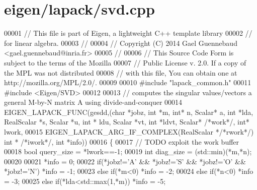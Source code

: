 \hypertarget{eigen_2lapack_2svd_8cpp_source}{}\section{eigen/lapack/svd.cpp}
\label{eigen_2lapack_2svd_8cpp_source}

\begin{DoxyCode}
00001 \textcolor{comment}{// This file is part of Eigen, a lightweight C++ template library}
00002 \textcolor{comment}{// for linear algebra.}
00003 \textcolor{comment}{//}
00004 \textcolor{comment}{// Copyright (C) 2014 Gael Guennebaud <gael.guennebaud@inria.fr>}
00005 \textcolor{comment}{//}
00006 \textcolor{comment}{// This Source Code Form is subject to the terms of the Mozilla}
00007 \textcolor{comment}{// Public License v. 2.0. If a copy of the MPL was not distributed}
00008 \textcolor{comment}{// with this file, You can obtain one at http://mozilla.org/MPL/2.0/.}
00009 
00010 \textcolor{preprocessor}{#include "lapack\_common.h"}
00011 \textcolor{preprocessor}{#include <Eigen/SVD>}
00012 
00013 \textcolor{comment}{// computes the singular values/vectors a general M-by-N matrix A using divide-and-conquer}
00014 EIGEN\_LAPACK\_FUNC(gesdd,(\textcolor{keywordtype}{char} *jobz, \textcolor{keywordtype}{int} *m, \textcolor{keywordtype}{int}* n, Scalar* a, \textcolor{keywordtype}{int} *lda, RealScalar *s, Scalar *u, \textcolor{keywordtype}{int} *
      ldu, Scalar *vt, \textcolor{keywordtype}{int} *ldvt, Scalar* \textcolor{comment}{/*work*/}, \textcolor{keywordtype}{int}* lwork,
00015                          EIGEN\_LAPACK\_ARG\_IF\_COMPLEX(RealScalar *\textcolor{comment}{/*rwork*/}) \textcolor{keywordtype}{int} * \textcolor{comment}{/*iwork*/}, \textcolor{keywordtype}{int} *info))
00016 \{
00017   \textcolor{comment}{// TODO exploit the work buffer}
00018   \textcolor{keywordtype}{bool} query\_size = *lwork==-1;
00019   \textcolor{keywordtype}{int} diag\_size = (std::min)(*m,*n);
00020   
00021   *info = 0;
00022         \textcolor{keywordflow}{if}(*jobz!=\textcolor{charliteral}{'A'} && *jobz!=\textcolor{charliteral}{'S'} && *jobz!=\textcolor{charliteral}{'O'} && *jobz!=\textcolor{charliteral}{'N'})  *info = -1;
00023   \textcolor{keywordflow}{else}  \textcolor{keywordflow}{if}(*m<0)                                                  *info = -2;
00024   \textcolor{keywordflow}{else}  \textcolor{keywordflow}{if}(*n<0)                                                  *info = -3;
00025   \textcolor{keywordflow}{else}  \textcolor{keywordflow}{if}(*lda<std::max(1,*m))                                   *info = -5;

\end{DoxyCode}
